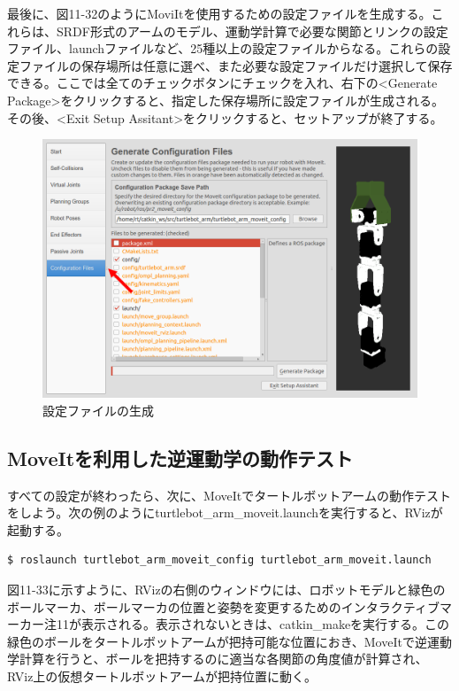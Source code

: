 最後に、図11-32のようにMoviItを使用するための設定ファイルを生成する。これらは、SRDF形式のアームのモデル、運動学計算で必要な関節とリンクの設定ファイル、launchファイルなど、25種以上の設定ファイルからなる。これらの設定ファイルの保存場所は任意に選べ、また必要な設定ファイルだけ選択して保存できる。ここでは全てのチェックボタンにチェックを入れ、右下の<Generate Package>をクリックすると、指定した保存場所に設定ファイルが生成される。その後、<Exit Setup Assitant>をクリックすると、セットアップが終了する。

\begin{figure}[htp]
  \centering
  \includegraphics[width=12cm]{pictures/chapter11/pic_11_32.png}
  \caption{設定ファイルの生成}
\end{figure}

\subsection{MoveItを利用した逆運動学の動作テスト}

すべての設定が終わったら、次に、MoveItでタートルボットアームの動作テストをしよう。次の例のようにturtlebot\_arm\_moveit.launchを実行すると、RVizが起動する。

\begin{lstlisting}[language=ROS]
$ roslaunch turtlebot_arm_moveit_config turtlebot_arm_moveit.launch
\end{lstlisting}

図11-33に示すように、RVizの右側のウィンドウには、ロボットモデルと緑色のボールマーカ、ボールマーカの位置と姿勢を変更するためのインタラクティブマーカー注11が表示される。表示されないときは、catkin\_makeを実行する。この緑色のボールをタートルボットアームが把持可能な位置におき、MoveItで逆運動学計算を行うと、ボールを把持するのに適当な各関節の角度値が計算され、RViz上の仮想タートルボットアームが把持位置に動く。

